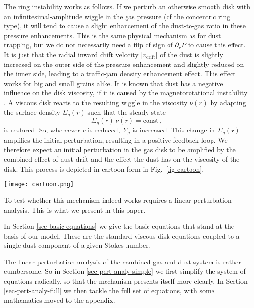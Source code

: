 \documentclass{aa}
\def\comma{\,,}
\begin{document}
The ring instability works as follows. If we perturb an otherwise
smooth disk with an infinitesimal-amplitude wiggle in the gas pressure (of the
concentric ring type), it will tend to cause a slight enhancement of the
dust-to-gas ratio in these pressure enhancements. This is the same physical
mechanism as for dust trapping, but we do not necessarily need a flip of sign of
$\partial_r P$ to cause this effect. It is just that the radial inward drift
velocity $|v_{\mathrm{drift}}|$ of the dust is slightly increased on the outer
side of the pressure enhancement and slightly reduced on the inner side, leading
to a traffic-jam density enhancement effect. This effect works for big and small
grains alike. It is known that dust has a negative influence on the disk
viscosity, if it is caused by the magnetorotational instability
\citep[e.g.][]{2000ApJ...543..486S, 2006A&A...445..205I, 2009ApJ...698.1122O,
  2013ApJ...765..114D}. A viscous disk reacts to the resulting wiggle in
the viscosity $\nu(r)$ by adapting the surface density $\Sigma_g(r)$ such that
the steady-state
\begin{equation}
\Sigma_g(r)\,\nu(r) = \mathrm{const}\comma
\end{equation}
is restored. So, whereever $\nu$ is reduced, $\Sigma_g$ is increased. This change 
in $\Sigma_g(r)$ amplifies the initial perturbation, resulting in a positive feedback
loop. We therefore expect an initial perturbation in the gas disk to be amplified
by the combined effect of dust drift and the effect the dust has on the viscosity
of the disk. This process is depicted in cartoon form in Fig.~\ref{fig-cartoon}.

\begin{figure*}
  \centerline{\texttt{[image: cartoon.png]}}
  \caption{\label{fig-cartoon}Mechanism of the ring
    instability studied in this paper.}
\end{figure*}

To test whether this mechanism indeed works requires a linear perturbation
analysis. This is what we present in this paper.

In Section \ref{sec-basic-equations} we give the basic equations that stand
at the basis of our model. These are the standard viscous disk equations
coupled to a single dust component of a given Stokes number.

The linear perturbation analysis of the combined gas and dust system is rather
cumbersome. So in Section \ref{sec-pert-analy-simple} we first simplify the
system of equations radically, so that the mechanism presents itself more
clearly. In Section \ref{sec-pert-analy-full} we then tackle the full
set of equations, with some mathematics moved to the appendix. 
\end{document}
